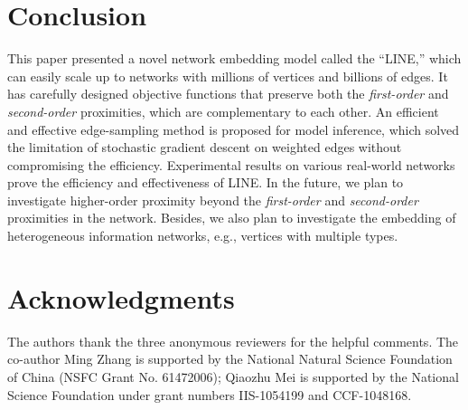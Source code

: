 \documentclass{sig-alternate-2013}
\begin{document}
\section{Conclusion}
\label{sec::conclusion}






This paper presented a novel network embedding model called the ``LINE,'' which can easily scale up to networks with millions of vertices and billions of edges. It has carefully designed objective functions that preserve both the \emph{first-order} and \emph{second-order} proximities, which are complementary to each other. An efficient and effective edge-sampling method is proposed for model inference, which solved the limitation of stochastic gradient descent on weighted edges without compromising the efficiency. Experimental results on various real-world networks prove the efficiency and effectiveness of LINE. 
In the future, we plan to investigate higher-order proximity beyond the \emph{first-order} and \emph{second-order} proximities in the network. Besides, we also plan to investigate the embedding of heterogeneous information networks, e.g., vertices with multiple types. 

\section*{Acknowledgments}
The authors thank the three anonymous reviewers for the helpful comments. The co-author Ming Zhang is supported by the National Natural Science Foundation of China (NSFC Grant No. 61472006); Qiaozhu Mei is supported by the National Science Foundation under grant numbers IIS-1054199 and CCF-1048168. 


\end{document}
